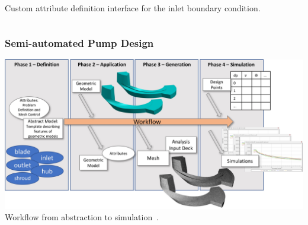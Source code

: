 \documentclass{beamer}
\begin{document}
\begin{frame}
\begin{columns}
\begin{column}{0.3\textwidth}
       Custom attribute definition interface for the inlet boundary condition.
    \end{column}
  \end{columns}

\end{frame}

\begin{frame}
  \frametitle{Semi-automated Pump Design}
  \centering
  \includegraphics[width=\textwidth]{../applications/figures/pumpAbstractModelWorkflowSummary.jpg}\\
  Workflow from abstraction to simulation~\cite{simmodsuite}.
\end{frame}

\end{document}
